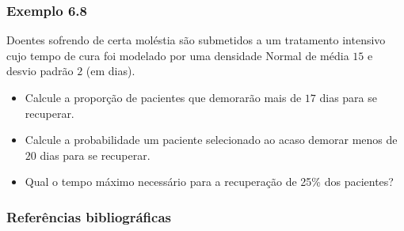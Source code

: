 \documentclass[11pt]{beamer}
\begin{document}
\begin{frame}
\frametitle{Exemplo 6.8}

Doentes sofrendo de certa moléstia são submetidos a um tratamento
intensivo cujo tempo de cura foi modelado por uma densidade Normal de
média \(15\) e desvio padrão \(2\) (em dias).

\begin{itemize}
\item
  Calcule a proporção de pacientes que demorarão mais de \(17\) dias
  para se recuperar.
\item
  Calcule a probabilidade um paciente selecionado ao acaso demorar menos
  de \(20\) dias para se recuperar.
\item
  Qual o tempo máximo necessário para a recuperação de 25\% dos
  pacientes?

\end{itemize}
\end{frame}

\begin{frame}
\frametitle{Referências bibliográficas}
\printbibliography
\end{frame}
\end{document}
